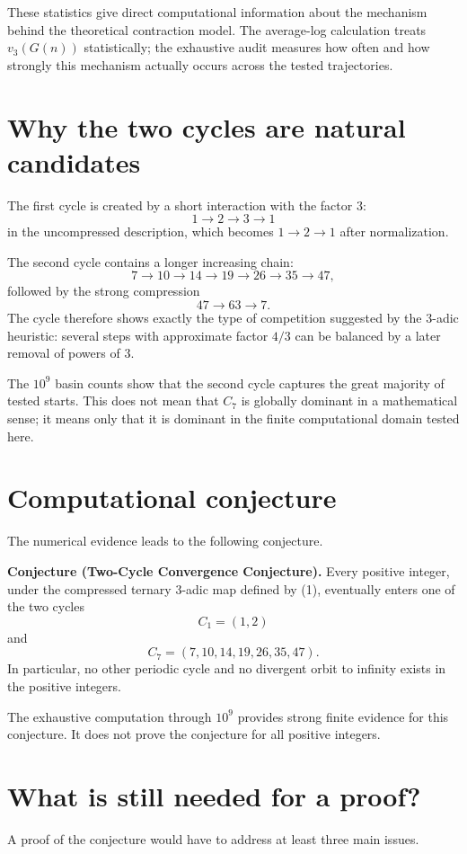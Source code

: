 \documentclass[11pt]{article}
\begin{document}
These statistics give direct computational information about the mechanism behind the theoretical contraction model. The average-log calculation treats $v_3(G(n))$ statistically; the exhaustive audit measures how often and how strongly this mechanism actually occurs across the tested trajectories.

\section{Why the two cycles are natural candidates}
The first cycle is created by a short interaction with the factor $3$:
\[
1\to2\to3\to1
\]
in the uncompressed description, which becomes $1\to2\to1$ after normalization.

The second cycle contains a longer increasing chain:
\[
7\to10\to14\to19\to26\to35\to47,
\]
followed by the strong compression
\[
47\to63\to7.
\]
The cycle therefore shows exactly the type of competition suggested by the $3$-adic heuristic: several steps with approximate factor $4/3$ can be balanced by a later removal of powers of $3$.

The $10^9$ basin counts show that the second cycle captures the great majority of tested starts. This does not mean that $C_7$ is globally dominant in a mathematical sense; it means only that it is dominant in the finite computational domain tested here.

\section{Computational conjecture}
The numerical evidence leads to the following conjecture.

\textbf{Conjecture (Two-Cycle Convergence Conjecture).} Every positive integer, under the compressed ternary $3$-adic map defined by (1), eventually enters one of the two cycles
\[
C_1=(1,2)
\]
and
\[
C_7=(7,10,14,19,26,35,47).
\]
In particular, no other periodic cycle and no divergent orbit to infinity exists in the positive integers.

The exhaustive computation through $10^9$ provides strong finite evidence for this conjecture. It does not prove the conjecture for all positive integers.

\section{What is still needed for a proof?}
A proof of the conjecture would have to address at least three main issues.
\end{document}
